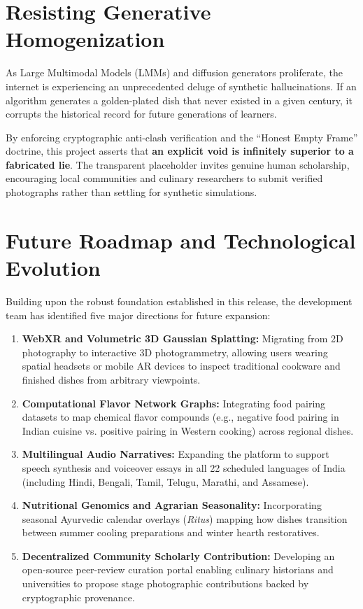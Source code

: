 \documentclass[11pt,a4paper]{report}
\begin{document}
\section{Resisting Generative Homogenization}
As Large Multimodal Models (LMMs) and diffusion generators proliferate, the internet is experiencing an unprecedented deluge of synthetic hallucinations. If an algorithm generates a golden-plated dish that never existed in a given century, it corrupts the historical record for future generations of learners. 

By enforcing cryptographic anti-clash verification and the ``Honest Empty Frame'' doctrine, this project asserts that \textbf{an explicit void is infinitely superior to a fabricated lie}. The transparent placeholder invites genuine human scholarship, encouraging local communities and culinary researchers to submit verified photographs rather than settling for synthetic simulations.

\section{Future Roadmap and Technological Evolution}
Building upon the robust foundation established in this release, the development team has identified five major directions for future expansion:
\begin{enumerate}
    \item \textbf{WebXR and Volumetric 3D Gaussian Splatting:} Migrating from 2D photography to interactive 3D photogrammetry, allowing users wearing spatial headsets or mobile AR devices to inspect traditional cookware and finished dishes from arbitrary viewpoints.
    \item \textbf{Computational Flavor Network Graphs:} Integrating food pairing datasets to map chemical flavor compounds (e.g., negative food pairing in Indian cuisine vs. positive pairing in Western cooking) across regional dishes.
    \item \textbf{Multilingual Audio Narratives:} Expanding the platform to support speech synthesis and voiceover essays in all 22 scheduled languages of India (including Hindi, Bengali, Tamil, Telugu, Marathi, and Assamese).
    \item \textbf{Nutritional Genomics and Agrarian Seasonality:} Incorporating seasonal Ayurvedic calendar overlays (\emph{Ritus}) mapping how dishes transition between summer cooling preparations and winter hearth restoratives.
    \item \textbf{Decentralized Community Scholarly Contribution:} Developing an open-source peer-review curation portal enabling culinary historians and universities to propose stage photographic contributions backed by cryptographic provenance.
\end{enumerate}
\end{document}
